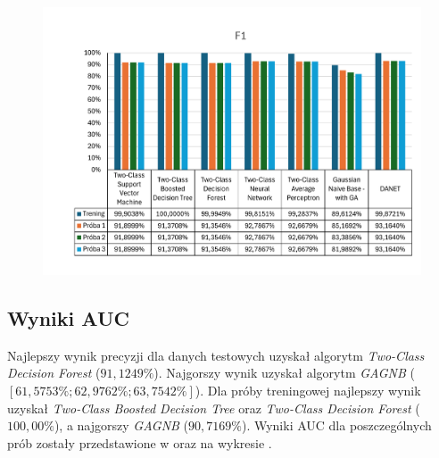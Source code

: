 \begin{figure}[H]
    \centering
    \includegraphics[width=\textwidth]{images/f1-res}
    \label{fig:f1-res}
\end{figure}

\subsection{Wyniki AUC}
Najlepszy wynik precyzji dla danych testowych uzyskał algorytm \textit{Two-Class Decision Forest} ($91,1249\%$). Najgorszy wynik uzyskał algorytm \textit{GAGNB} ($[61,5753\%; 62,9762\%; 63,7542\%]$). Dla próby treningowej najlepszy wynik uzyskał \textit{Two-Class Boosted Decision Tree} oraz \textit{Two-Class Decision Forest} ($100,00\%$), a najgorszy \textit{GAGNB} ($90,7169\%$). Wyniki AUC dla poszczególnych prób zostały przedstawione w  oraz na wykresie .

